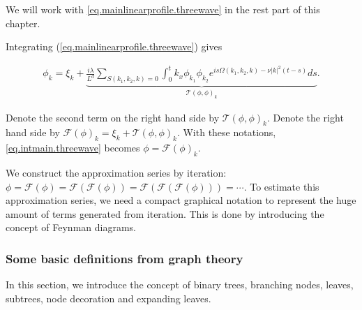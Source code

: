 We will work with \eqref{eq.mainlinearprofile.threewave} in the rest part of this chapter. 




Integrating (\ref{eq.mainlinearprofile.threewave}) gives

\begin{equation}\label{eq.intmain.threewave}
\begin{split}
    \phi_k =\xi_k+
    \underbrace{\frac{i\lambda}{L^{d}} \sum\limits_{S(k_1,k_2,k)=0}\int^{t}_0k_{x}\phi_{k_1} \phi_{k_2}e^{i s\Omega(k_1,k_2,k)- \nu|k|^2(t-s)} ds}_{\mathcal{T}(\phi,\phi)_k}.  
\end{split}
\end{equation}


Denote the second term on the right hand side by $\mathcal{T}(\phi,\phi)_k$. Denote the right hand side by $\mathcal{F}(\phi)_k=\xi_k+\mathcal{T}(\phi,\phi)_k$. With these notations, \eqref{eq.intmain.threewave} becomes  $\phi=\mathcal{F}(\phi)_k$. 

We construct the approximation series by iteration: $\phi=\mathcal{F}(\phi)=\mathcal{F}(\mathcal{F}(\phi))=\mathcal{F}(\mathcal{F}(\mathcal{F}(\phi)))=\cdots$. To estimate this approximation series, we need a compact graphical notation to represent the huge amount of terms generated from iteration. This is done by introducing the concept of Feynman diagrams.

\subsubsection{Some basic definitions from graph theory} In this section, we introduce the concept of binary trees, branching nodes, leaves, subtrees, node decoration
and expanding leaves.

